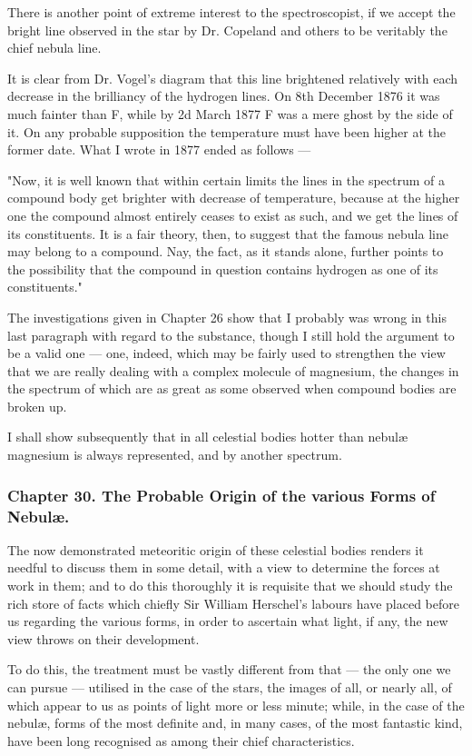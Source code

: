 \documentclass[a4paper, 12pt, oneside, polutonikogreek, english]{article}
\begin{document}
There is another point of extreme interest to the spectroscopist, if we accept the bright line observed in the star by Dr. Copeland and others to be veritably the chief nebula line.

It is clear from Dr. Vogel's diagram that this line brightened relatively with each decrease in the brilliancy of the hydrogen lines. On 8th December 1876 it was much fainter than F, while by 2d March 1877 F was a mere ghost by the side of it. On any probable supposition the temperature must have been higher at the former date. What I wrote in 1877 ended as follows ---

"Now, it is well known that within certain limits the lines in the spectrum of a compound body get brighter with decrease of temperature, because at the higher one the compound almost entirely ceases to exist as such, and we get the lines of its constituents. It is a fair theory, then, to suggest that the famous nebula line may belong to a compound. Nay, the fact, as it stands alone, further points to the possibility that the compound in question contains hydrogen as one of its constituents."

The investigations given in Chapter 26 show that I probably was wrong in this last paragraph with regard to the substance, though I still hold the argument to be a valid one --- one, indeed, which may be fairly used to strengthen the view that we are really dealing with a complex molecule of magnesium, the changes in the spectrum of which are as great as some observed when compound bodies are broken up.

I shall show subsequently that in all celestial bodies hotter than nebulæ magnesium is always represented, and by another spectrum.

\subsubsection{Chapter 30. The Probable Origin of the various Forms of Nebulæ.}

The now demonstrated meteoritic origin of these celestial bodies renders it needful to discuss them in some detail, with a view to determine the forces at work in them; and to do this thoroughly it is requisite that we should study the rich store of facts which chiefly Sir William Herschel's labours have placed before us regarding the various forms, in order to ascertain what light, if any, the new view throws on their development.

To do this, the treatment must be vastly different from that --- the only one we can pursue --- utilised in the case of the stars, the images of all, or nearly all, of which appear to us as points of light more or less minute; while, in the case of the nebulæ, forms of the most definite and, in many cases, of the most fantastic kind, have been long recognised as among their chief characteristics.
\end{document}
